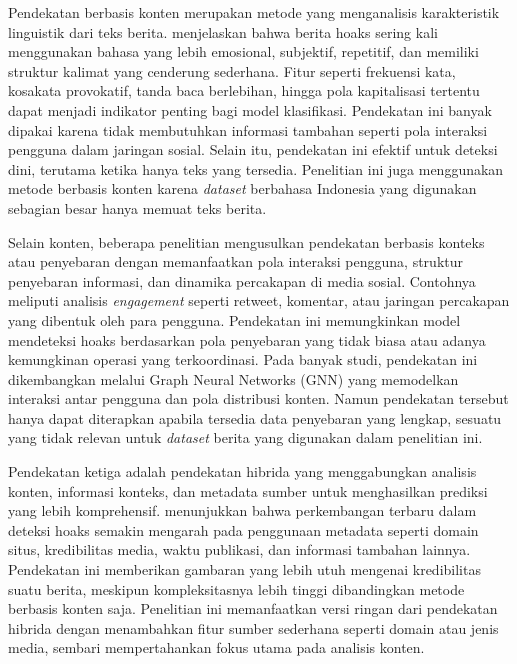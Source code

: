 Pendekatan berbasis konten merupakan metode yang menganalisis karakteristik linguistik dari teks berita. \textcite{alghamdi2024comprehensive} menjelaskan bahwa berita hoaks sering kali menggunakan bahasa yang lebih emosional, subjektif, repetitif, dan memiliki struktur kalimat yang cenderung sederhana. Fitur seperti frekuensi kata, kosakata provokatif, tanda baca berlebihan, hingga pola kapitalisasi tertentu dapat menjadi indikator penting bagi model klasifikasi. Pendekatan ini banyak dipakai karena tidak membutuhkan informasi tambahan seperti pola interaksi pengguna dalam jaringan sosial. Selain itu, pendekatan ini efektif untuk deteksi dini, terutama ketika hanya teks yang tersedia. Penelitian ini juga menggunakan metode berbasis konten karena \textit{dataset} berbahasa Indonesia yang digunakan sebagian besar hanya memuat teks berita.

Selain konten, beberapa penelitian mengusulkan pendekatan berbasis konteks atau penyebaran dengan memanfaatkan pola interaksi pengguna, struktur penyebaran informasi, dan dinamika percakapan di media sosial. Contohnya meliputi analisis \textit{engagement} seperti retweet, komentar, atau jaringan percakapan yang dibentuk oleh para pengguna. Pendekatan ini memungkinkan model mendeteksi hoaks berdasarkan pola penyebaran yang tidak biasa atau adanya kemungkinan operasi yang terkoordinasi. Pada banyak studi, pendekatan ini dikembangkan melalui Graph Neural Networks (GNN) yang memodelkan interaksi antar pengguna dan pola distribusi konten. Namun pendekatan tersebut hanya dapat diterapkan apabila tersedia data penyebaran yang lengkap, sesuatu yang tidak relevan untuk \textit{dataset} berita yang digunakan dalam penelitian ini.

Pendekatan ketiga adalah pendekatan hibrida yang menggabungkan analisis konten, informasi konteks, dan metadata sumber untuk menghasilkan prediksi yang lebih komprehensif. \textcite{emilremus2025} menunjukkan bahwa perkembangan terbaru dalam deteksi hoaks semakin mengarah pada penggunaan metadata seperti domain situs, kredibilitas media, waktu publikasi, dan informasi tambahan lainnya. Pendekatan ini memberikan gambaran yang lebih utuh mengenai kredibilitas suatu berita, meskipun kompleksitasnya lebih tinggi dibandingkan metode berbasis konten saja. Penelitian ini memanfaatkan versi ringan dari pendekatan hibrida dengan menambahkan fitur sumber sederhana seperti domain atau jenis media, sembari mempertahankan fokus utama pada analisis konten.

